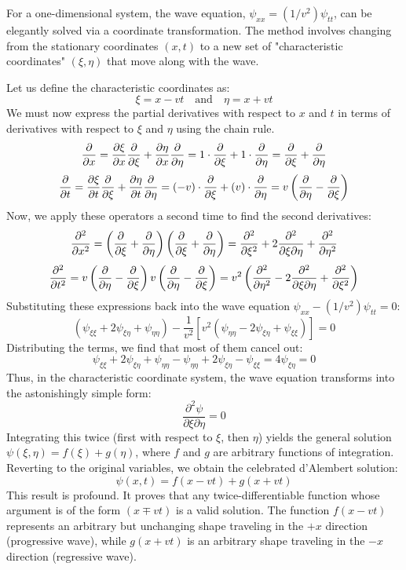 \begin{theorem}
For a one-dimensional system, the wave equation, $\psi_{xx} = (1/v^2)\psi_{tt}$, can be elegantly solved via a coordinate transformation. The method involves changing from the stationary coordinates $(x, t)$ to a new set of "characteristic coordinates" $(\xi, \eta)$ that move along with the wave.

Let us define the characteristic coordinates as:
$$ \xi = x - vt \quad \text{and} \quad \eta = x + vt $$
We must now express the partial derivatives with respect to $x$ and $t$ in terms of derivatives with respect to $\xi$ and $\eta$ using the chain rule.
$$ \frac{\partial }{\partial x} = \frac{\partial \xi}{\partial x}\frac{\partial }{\partial \xi} + \frac{\partial \eta}{\partial x}\frac{\partial }{\partial \eta} = 1 \cdot \frac{\partial }{\partial \xi} + 1 \cdot \frac{\partial }{\partial \eta} = \frac{\partial }{\partial \xi} + \frac{\partial }{\partial \eta} $$
$$ \frac{\partial }{\partial t} = \frac{\partial \xi}{\partial t}\frac{\partial }{\partial \xi} + \frac{\partial \eta}{\partial t}\frac{\partial }{\partial \eta} = (-v) \cdot \frac{\partial }{\partial \xi} + (v) \cdot \frac{\partial }{\partial \eta} = v\left(\frac{\partial }{\partial \eta} - \frac{\partial }{\partial \xi}\right) $$
Now, we apply these operators a second time to find the second derivatives:
$$ \frac{\partial^2}{\partial x^2} = \left(\frac{\partial }{\partial \xi} + \frac{\partial }{\partial \eta}\right)\left(\frac{\partial }{\partial \xi} + \frac{\partial }{\partial \eta}\right) = \frac{\partial^2}{\partial \xi^2} + 2\frac{\partial^2}{\partial \xi \partial \eta} + \frac{\partial^2}{\partial \eta^2} $$
$$ \frac{\partial^2}{\partial t^2} = v\left(\frac{\partial }{\partial \eta} - \frac{\partial }{\partial \xi}\right) v\left(\frac{\partial }{\partial \eta} - \frac{\partial }{\partial \xi}\right) = v^2\left(\frac{\partial^2}{\partial \eta^2} - 2\frac{\partial^2}{\partial \xi \partial \eta} + \frac{\partial^2}{\partial \xi^2}\right) $$
Substituting these expressions back into the wave equation $\psi_{xx} - (1/v^2)\psi_{tt} = 0$:
$$ \left(\psi_{\xi\xi} + 2\psi_{\xi\eta} + \psi_{\eta\eta}\right) - \frac{1}{v^2} \left[ v^2(\psi_{\eta\eta} - 2\psi_{\xi\eta} + \psi_{\xi\xi}) \right] = 0 $$
Distributing the terms, we find that most of them cancel out:
$$ \psi_{\xi\xi} + 2\psi_{\xi\eta} + \psi_{\eta\eta} - \psi_{\eta\eta} + 2\psi_{\xi\eta} - \psi_{\xi\xi} = 4\psi_{\xi\eta} = 0 $$
Thus, in the characteristic coordinate system, the wave equation transforms into the astonishingly simple form:
$$ \frac{\partial^2 \psi}{\partial \xi \partial \eta} = 0 $$
Integrating this twice (first with respect to $\xi$, then $\eta$) yields the general solution $\psi(\xi, \eta) = f(\xi) + g(\eta)$, where $f$ and $g$ are arbitrary functions of integration. Reverting to the original variables, we obtain the celebrated d'Alembert solution:
$$ \psi(x, t) = f(x - vt) + g(x + vt) $$
This result is profound. It proves that any twice-differentiable function whose argument is of the form $(x \mp vt)$ is a valid solution. The function $f(x-vt)$ represents an arbitrary but unchanging shape traveling in the $+x$ direction (progressive wave), while $g(x+vt)$ is an arbitrary shape traveling in the $-x$ direction (regressive wave).
\end{theorem}


